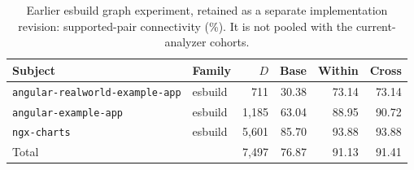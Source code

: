 \begin{table}[t]
\caption{Earlier esbuild graph experiment, retained as a separate implementation revision: supported-pair connectivity (\%). It is not pooled with the current-analyzer cohorts.}
\label{tab:simulation-esbuild}
\centering\small
\setlength{\tabcolsep}{4pt}
\begin{tabular}{@{}p{.34\linewidth}lrrrr@{}}
\toprule
Subject & Family & $D$ & Base & Within & Cross\\
\midrule
\nolinkurl{angular-realworld-example-app} & esbuild & 711 & 30.38 & 73.14 & 73.14\\
\nolinkurl{angular-example-app} & esbuild & 1,185 & 63.04 & 88.95 & 90.72\\
\nolinkurl{ngx-charts} & esbuild & 5,601 & 85.70 & 93.88 & 93.88\\
\midrule
Total & & 7,497 & 76.87 & 91.13 & 91.41\\
\bottomrule
\end{tabular}
\end{table}
